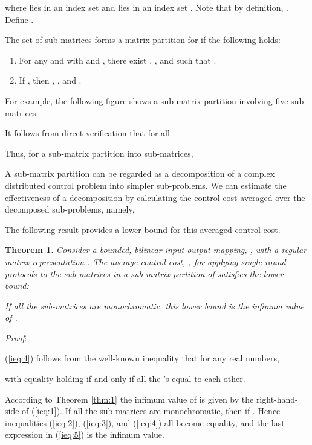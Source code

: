\documentclass[12pt,onecolumn,draftcls]{IEEEtran}
\newtheorem{theorem}{Theorem}[section]
\begin{document}
where  lies in an index set 
and  lies in an index set .   Note that by definition,
.   Define .

The set of sub-matrices forms a matrix partition for  if the following holds:
\begin{enumerate}
\item
For any  and  with  and , there exist , , and  such that
.
\item If , then
,  , and .
\end{enumerate}

For example, the following figure shows a sub-matrix partition involving five sub-matrices:


It follows from direct verification that for all 

Thus, for a sub-matrix partition into  sub-matrices,


A sub-matrix partition can be regarded as a decomposition of a complex distributed control problem into simpler
sub-problems.  We can estimate the effectiveness of a decomposition by calculating the control cost averaged
over the decomposed sub-problems, namely,

The following result provides a lower bound for this averaged control cost.

\begin{theorem}
\label{thm:2}
Consider a bounded, bilinear input-output mapping, , with a regular matrix representation .
The average control cost, , for applying single round protocols to the sub-matrices in a sub-matrix partition
 of  satisfies the lower bound:

If all the sub-matrices are monochromatic, this lower bound is the infimum value of .
\end{theorem}

\noindent
\textit{Proof}: \rm


(\ref{ieq:4}) follows from the well-known inequality that for any real numbers, 

with equality holding if and only if all the 's equal to each other.

According to Theorem \ref{thm:1} the infimum value of  is given by the right-hand-side of (\ref{ieq:1}).
If all the sub-matrices are monochromatic, then
 if .  Hence inequalities (\ref{ieq:2}), (\ref{ieq:3}), and (\ref{ieq:4}) all become equality, and
the last expression in (\ref{ieq:5}) is the infimum value.
\hfill 
\end{document}
